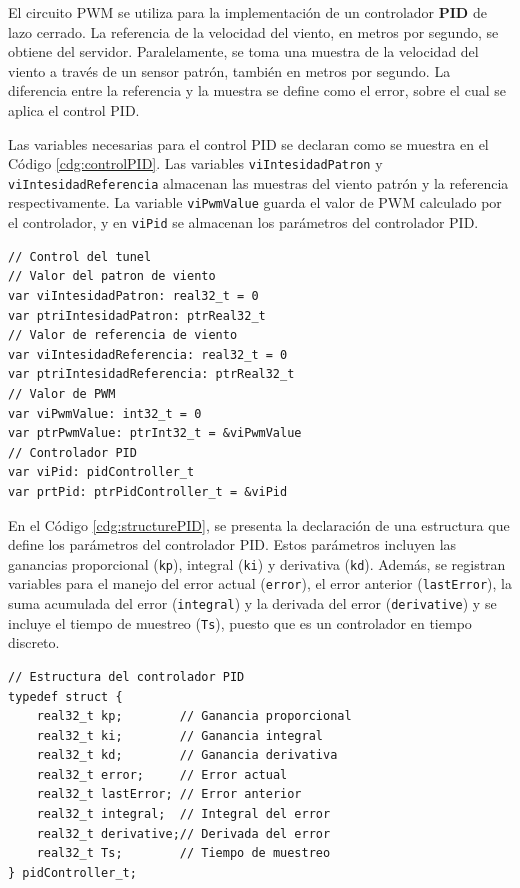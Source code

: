 El circuito PWM se utiliza para la implementación de un controlador \textbf{PID} de lazo cerrado. La referencia de la velocidad del viento, en metros por segundo, se obtiene del servidor. Paralelamente, se toma una muestra de la velocidad del viento a través de un sensor patrón, también en metros por segundo. La diferencia entre la referencia y la muestra se define como el error, sobre el cual se aplica el control PID.

Las variables necesarias para el control PID se declaran como se muestra en el Código \ref{cdg:controlPID}. Las variables \texttt{viIntesidadPatron} y \texttt{viIntesidadReferencia} almacenan las muestras del viento patrón y la referencia respectivamente. La variable \texttt{viPwmValue} guarda el valor de PWM calculado por el controlador, y en \texttt{viPid} se almacenan los parámetros del controlador PID.

\begin{lstlisting}[style=yakindustyle, caption={Declaración de variables para el controlador PID del motor del túnel de viento.}, label=cdg:controlPID,basicstyle=\ttfamily\fontsize{8}{8}\selectfont]
// Control del tunel
// Valor del patron de viento
var viIntesidadPatron: real32_t = 0
var ptriIntesidadPatron: ptrReal32_t
// Valor de referencia de viento
var viIntesidadReferencia: real32_t = 0
var ptriIntesidadReferencia: ptrReal32_t
// Valor de PWM
var viPwmValue: int32_t = 0
var ptrPwmValue: ptrInt32_t = &viPwmValue
// Controlador PID
var viPid: pidController_t 
var prtPid: ptrPidController_t = &viPid
\end{lstlisting}

En el Código \ref{cdg:structurePID}, se presenta la declaración de una estructura que define los parámetros del controlador PID. Estos parámetros incluyen las ganancias proporcional (\texttt{kp}), integral (\texttt{ki}) y derivativa (\texttt{kd}). Además, se registran variables para el manejo del error actual (\texttt{error}), el error anterior (\texttt{lastError}), la suma acumulada del error (\texttt{integral}) y la derivada del error (\texttt{derivative}) y se incluye el tiempo de muestreo (\texttt{Ts}), puesto que es un controlador en tiempo discreto.

\begin{lstlisting}[style=cstyle, caption={Estructura para los parámetros y variables del controlador PID.}, label=cdg:structurePID,basicstyle=\ttfamily\fontsize{8}{8}\selectfont]
// Estructura del controlador PID
typedef struct {
	real32_t kp;        // Ganancia proporcional
	real32_t ki;        // Ganancia integral
	real32_t kd;        // Ganancia derivativa
	real32_t error;     // Error actual
	real32_t lastError; // Error anterior
	real32_t integral;  // Integral del error
	real32_t derivative;// Derivada del error
	real32_t Ts;        // Tiempo de muestreo
} pidController_t;
\end{lstlisting}

